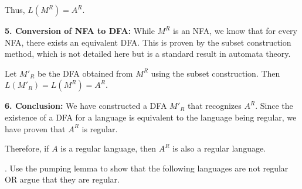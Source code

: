 \documentclass[12pt]{article}
\newcounter{quesnum}
\newcommand{\question}[2][??]{
\begin{list}{\labelitemi}{\leftmargin=2em}
\item [\arabic{quesnum}.] {} {#2}
\end{list}
\addtocounter{quesnum}{1}
}
\begin{document}
Thus, $L(M^R) = A^R$.

\textbf{5. Conversion of NFA to DFA:}  
While $M^R$ is an NFA, we know that for every NFA, there exists an equivalent DFA. This is proven by the subset construction method, which is not detailed here but is a standard result in automata theory.

Let $M'_R$ be the DFA obtained from $M^R$ using the subset construction. Then $L(M'_R) = L(M^R) = A^R$.

\textbf{6. Conclusion:}  
We have constructed a DFA $M'_R$ that recognizes $A^R$. Since the existence of a DFA for a language is equivalent to the language being regular, we have proven that $A^R$ is regular.

Therefore, if $A$ is a regular language, then $A^R$ is also a regular language.

\vspace{12pt}

\question[3]{
Use the pumping lemma to show that the following languages are not regular OR argue that they are regular. 
}
\end{document}
